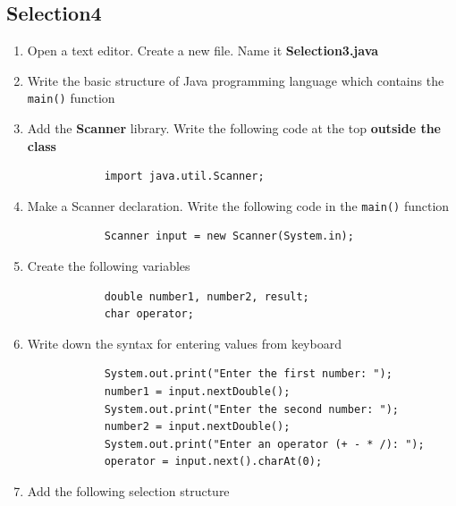 \documentclass[12pt,titlepage]{article}
\begin{document}
\subsection{Selection4}
\begin{enumerate}
    \item Open a text editor. Create a new file. Name it \textbf{Selection3.java}
    \item Write the basic structure of Java programming language which contains the \texttt{main()} function
    \item {
        Add the \textbf{Scanner} library. Write the following code at the top \textbf{outside the class}

        \begin{verbatim}
            import java.util.Scanner;
        \end{verbatim}
    }
    \item {
        Make a Scanner declaration. Write the following code in the \texttt{main()} function

        \begin{verbatim}
            Scanner input = new Scanner(System.in);
        \end{verbatim}
    }
    \item {
        Create the following variables

        \begin{verbatim}
            double number1, number2, result;
            char operator;
        \end{verbatim}
    }
    \item {
        Write down the syntax for entering values from keyboard

        \begin{verbatim}
            System.out.print("Enter the first number: ");
            number1 = input.nextDouble();
            System.out.print("Enter the second number: ");
            number2 = input.nextDouble();
            System.out.print("Enter an operator (+ - * /): ");
            operator = input.next().charAt(0);
        \end{verbatim}
    }
    \item {
        Add the following selection structure

}
\end{enumerate}
\end{document}
